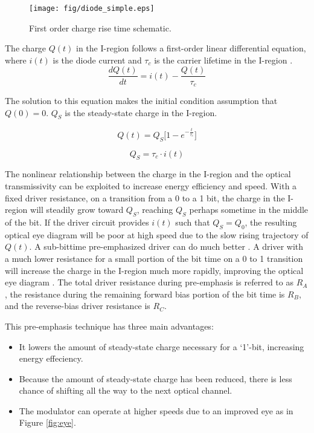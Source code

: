 	\begin{figure}[H]
		\begin{center}
			\texttt{[image: fig/diode\_simple.eps]}
			\caption{\label{fig:diode_simple}First order charge rise time schematic.}
		\end{center}
	\end{figure}


The charge $Q(t)$ in the I-region follows a first-order linear differential equation, where $i(t)$ is the diode current and $\tau_c$ is the carrier lifetime in the I-region \cite{pierret}.
	\begin{equation}
\frac{dQ(t)}{dt} = i(t) - \frac{Q(t)}{\tau_c}
	\label{eqn:dq-dt}
	\end{equation}

The solution to this equation makes the initial condition assumption that \mbox{$Q(0) = 0$}.  $Q_S$ is the steady-state charge in the I-region.

	\begin{equation}
Q(t) = Q_S \Big[ 1 - e^{-\frac{t}{\tau_c}}\Big]
	\end{equation}

	\begin{equation}
Q_S = \tau_c \cdot i(t)
	\end{equation}

The nonlinear relationship between the charge in the I-region and the optical transmissivity can be exploited to increase energy efficiency and speed.  With a fixed driver resistance, on a transition from a 0 to a 1 bit, the charge in the I-region will steadily grow toward $Q_S$, reaching $Q_S$ perhaps sometime in the middle of the bit.  If the driver circuit provides $i(t)$ such that $Q_S = Q_0$, the resulting optical eye diagram will be poor at high speed due to the slow rising trajectory of $Q(t)$.  A sub-bittime pre-emphasized driver can do much better \cite{kern_vlsi07}.  A  driver with a much lower resistance for a small portion of the bit time on a 0 to 1 transition will increase the charge in the I-region much more rapidly, improving the optical eye diagram \cite{xu_osa07}.  The total driver resistance during pre-emphasis is referred to as $R_A$, the resistance during the remaining forward bias portion of the bit time is $R_B$, and the reverse-bias driver resistance is $R_C$.


This pre-emphasis technique has three main advantages:

\begin{itemize} 
\item It lowers the amount of steady-state charge necessary for a `1'-bit, increasing energy effeciency.
\item Because the amount of steady-state charge has been reduced, there is less chance of shifting all the way to the next optical channel.
\item The modulator can operate at higher speeds due to an improved eye as in Figure \ref{fig:eye}.
\end{itemize}

